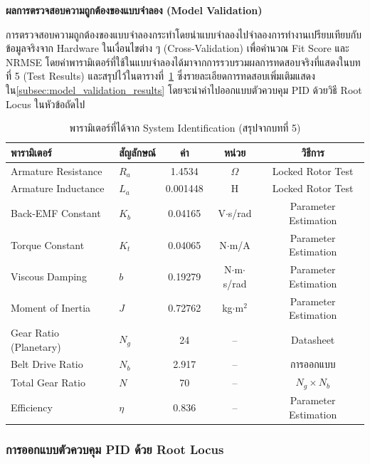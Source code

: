 \textbf{ผลการตรวจสอบความถูกต้องของแบบจำลอง (Model Validation)}

การตรวจสอบความถูกต้องของแบบจำลองกระทำโดยนำแบบจำลองไปจำลองการทำงานเปรียบเทียบกับข้อมูลจริงจาก Hardware ในเงื่อนไขต่าง ๆ (Cross-Validation) เพื่อคำนวณ Fit Score และ NRMSE โดยค่าพารามิเตอร์ที่ใช้ในแบบจำลองได้มาจากการรวบรวมผลการทดสอบจริงที่แสดงในบทที่ 5 (Test Results) และสรุปไว้ในตารางที่~\ref{tab:sysid_params} ซึ่งรายละเอียดการทดสอบเพิ่มเติมแสดงใน\cref{subsec:model_validation_results}
โดยจะนำค่าไปออกแบบตัวควบคุม PID ด้วยวิธี Root Locus ในหัวข้อถัดไป

\begin{table}[H]
  \centering
  \caption{พารามิเตอร์ที่ได้จาก System Identification (สรุปจากบทที่ 5)}
  \label{tab:sysid_params}
  \begin{tabular}{llccc}
    \toprule
    พารามิเตอร์ & สัญลักษณ์ & ค่า & หน่วย & วิธีการ \\
    \midrule
    Armature Resistance    & $R_a$  & 1.4534   & $\Omega$              & Locked Rotor Test \\
    Armature Inductance    & $L_a$  & 0.001448 & H                     & Locked Rotor Test \\
    Back-EMF Constant      & $K_b$  & 0.04165  & V$\cdot$s/rad         & Parameter Estimation \\
    Torque Constant        & $K_t$  & 0.04065  & N$\cdot$m/A           & Parameter Estimation \\
    Viscous Damping        & $b$    & 0.19279  & N$\cdot$m$\cdot$s/rad & Parameter Estimation \\
    Moment of Inertia      & $J$    & 0.72762  & kg$\cdot$m$^2$        & Parameter Estimation \\
    Gear Ratio (Planetary) & $N_g$  & 24       & --                    & Datasheet \\
    Belt Drive Ratio       & $N_b$  & 2.917    & --                    & การออกแบบ \\
    Total Gear Ratio       & $N$    & 70       & --                    & $N_g \times N_b$ \\
    Efficiency             & $\eta$ & 0.836    & --                    & Parameter Estimation \\
    \bottomrule
  \end{tabular}
\end{table}

\subsubsection{การออกแบบตัวควบคุม PID ด้วย Root Locus}
\label{subsubsec:pid_design}

